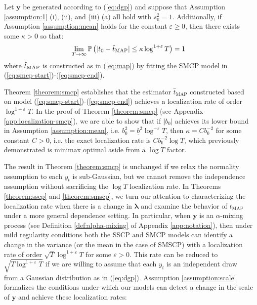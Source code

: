 \begin{theorem}\label{theorem:smcp}
    Let $\mathbf{y}$ be generated according to (\ref{eq:dgp}) and suppose that Assumption \ref{assumption:1} (i), (ii), and (iii) (a) all hold with $s_0^2 = 1$. Additionally, if Assumption \ref{assumption:mean} holds for the constant $\varepsilon \geq 0$, then there exists some $\kappa > 0$ so that:
    \vspace{-5pt}
    \begin{align*}
        \lim_{T\to\infty}\Pr\left(|t_0 - \hat{t}_{\normalfont \text{MAP}}| \leq \kappa \log^{1+\varepsilon} T\right) = 1  
    \end{align*}
    where $\hat{t}_{\normalfont \text{MAP}}$ is constructed as in (\ref{eq:map}) by fitting the SMCP model in (\ref{eq:smcp-start})-(\ref{eq:smcp-end}). 
\end{theorem}
Theorem \ref{theorem:smcp} establishes that the estimator $\hat{t}_{\text{MAP}}$ constructed based on model (\ref{eq:smcp-start})-(\ref{eq:smcp-end}) achieves a localization rate of order $\log^{1+\varepsilon} T$. In the proof of Theorem \ref{theorem:smcp} (see Appendix \ref{app:localization-smcp}), we are able to show that if $|b_0|$ achieves its lower bound in Assumption \ref{assumption:mean}, i.e. $b_0^2 = \underline{b }^2\log^{-\varepsilon}T$, then $\kappa = Cb_0^{-2}$ for some constant $C > 0$, i.e. the exact localization rate is $Cb_0^{-2} \log T$, which \cite{Wang2020_localization} previously demonstrated is minimax optimal aside from a $\log T$ factor. 

The result in Theorem \ref{theorem:smcp} is unchanged if we relax the normality assumption to each $y_t$ is sub-Gaussian, but we cannot remove the independence assumption without sacrificing the $\log T$ localization rate. In Theorems \ref{theorem:sscp} and \ref{theorem:smscp}, we turn our attention to characterizing the localization rate when there is a change in $\pmb{\lambda}$ and examine the behavior of $\hat{t}_{\text{MAP}}$ under a more general dependence setting. In particular, when $\mathbf{y}$ is an $\alpha$-mixing process (see Definition \ref{def:alpha-mixing} of Appendix \ref{app:notation}), then under mild regularity conditions both the SSCP and SMCP models can identify a change in the variance (or the mean in the case of SMSCP) with a localization rate of order $\sqrt{T}\log^{1+\varepsilon} T$ for some $\varepsilon >0 $. This rate can be reduced to $\sqrt{T\log^{1+\varepsilon} T}$ if we are willing to assume that each $y_t$ is an independent draw from a Gaussian distribution as in (\ref{eq:dgp}). Assumption \ref{assumption:scale} formalizes the conditions under which our models can detect a change in the scale of $\mathbf{y}$ and achieve these localization rates:

